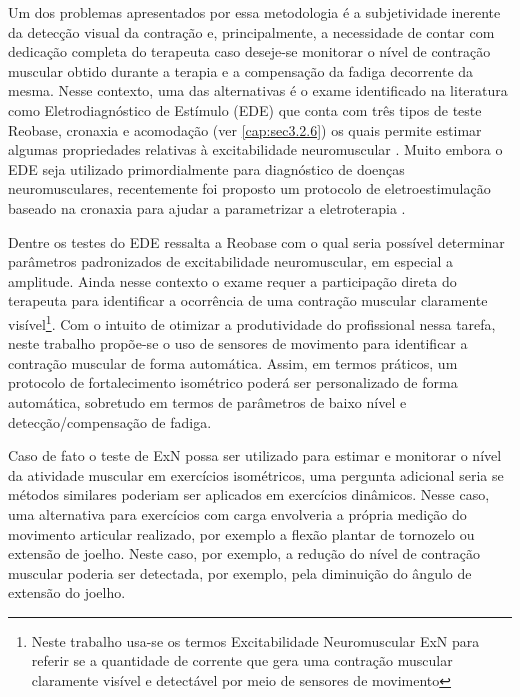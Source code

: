 Um dos problemas apresentados por essa metodologia é a subjetividade inerente da detecção visual da contração e, principalmente, a necessidade de contar com dedicação completa do terapeuta caso deseje-se monitorar o nível de contração muscular obtido durante a terapia e a compensação da fadiga decorrente da mesma. Nesse contexto, uma das alternativas é o exame identificado na literatura como Eletrodiagnóstico de Estímulo (\acrshort{EDE}) que conta com três tipos de teste Reobase, cronaxia e acomodação (ver \ref{cap:sec3.2.6}) os quais permite estimar algumas propriedades relativas à excitabilidade neuromuscular \cite{Kimura2013}. Muito embora o \acrshort{EDE} seja utilizado primordialmente para diagnóstico de doenças neuromusculares, recentemente foi proposto um protocolo de eletroestimulação baseado na cronaxia para ajudar a parametrizar a eletroterapia \cite{Silva2016}.  

Dentre os testes do \acrshort{EDE} ressalta a Reobase
com o qual seria possível determinar parâmetros padronizados de excitabilidade neuromuscular, em especial a amplitude. Ainda nesse contexto o exame requer a participação direta do terapeuta para identificar a ocorrência de uma contração muscular claramente visível\footnote{Neste trabalho usa-se os termos Excitabilidade Neuromuscular \acrshort{ExN} para referir se a quantidade de corrente que gera uma contração muscular claramente visível e detectável por meio de sensores de movimento}. Com o intuito de otimizar a produtividade do profissional nessa tarefa, neste trabalho propõe-se o uso de sensores de movimento para identificar a contração muscular de forma automática. Assim, em termos práticos, um protocolo de fortalecimento isométrico poderá ser personalizado de forma automática, sobretudo em termos de parâmetros de baixo nível e detecção/compensação de fadiga.

Caso de fato o teste de \acrshort{ExN} possa ser utilizado para estimar e monitorar o nível da atividade muscular em exercícios isométricos, uma pergunta adicional seria se métodos similares poderiam ser aplicados em exercícios dinâmicos. Nesse caso, uma alternativa para exercícios com carga envolveria a própria medição do movimento articular realizado, por exemplo a flexão plantar de tornozelo ou extensão de joelho. Neste caso, por exemplo, a redução do nível de contração muscular poderia ser detectada, por exemplo, pela diminuição do ângulo de extensão do joelho.

